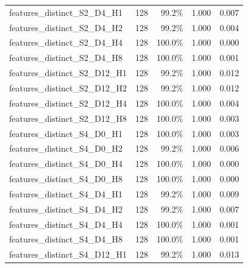 \documentclass[11pt]{article}
\begin{document}
\begin{longtable}{p{}rrrr}
features\_\allowbreak{}distinct\_\allowbreak{}S2\_\allowbreak{}D4\_\allowbreak{}H1 & 128 & 99.2\% & 1.000 & 0.007\\
features\_\allowbreak{}distinct\_\allowbreak{}S2\_\allowbreak{}D4\_\allowbreak{}H2 & 128 & 99.2\% & 1.000 & 0.004\\
features\_\allowbreak{}distinct\_\allowbreak{}S2\_\allowbreak{}D4\_\allowbreak{}H4 & 128 & 100.0\% & 1.000 & 0.000\\
features\_\allowbreak{}distinct\_\allowbreak{}S2\_\allowbreak{}D4\_\allowbreak{}H8 & 128 & 100.0\% & 1.000 & 0.001\\
features\_\allowbreak{}distinct\_\allowbreak{}S2\_\allowbreak{}D12\_\allowbreak{}H1 & 128 & 99.2\% & 1.000 & 0.012\\
features\_\allowbreak{}distinct\_\allowbreak{}S2\_\allowbreak{}D12\_\allowbreak{}H2 & 128 & 99.2\% & 1.000 & 0.012\\
features\_\allowbreak{}distinct\_\allowbreak{}S2\_\allowbreak{}D12\_\allowbreak{}H4 & 128 & 100.0\% & 1.000 & 0.004\\
features\_\allowbreak{}distinct\_\allowbreak{}S2\_\allowbreak{}D12\_\allowbreak{}H8 & 128 & 100.0\% & 1.000 & 0.003\\
features\_\allowbreak{}distinct\_\allowbreak{}S4\_\allowbreak{}D0\_\allowbreak{}H1 & 128 & 100.0\% & 1.000 & 0.003\\
features\_\allowbreak{}distinct\_\allowbreak{}S4\_\allowbreak{}D0\_\allowbreak{}H2 & 128 & 99.2\% & 1.000 & 0.006\\
features\_\allowbreak{}distinct\_\allowbreak{}S4\_\allowbreak{}D0\_\allowbreak{}H4 & 128 & 100.0\% & 1.000 & 0.000\\
features\_\allowbreak{}distinct\_\allowbreak{}S4\_\allowbreak{}D0\_\allowbreak{}H8 & 128 & 100.0\% & 1.000 & 0.000\\
features\_\allowbreak{}distinct\_\allowbreak{}S4\_\allowbreak{}D4\_\allowbreak{}H1 & 128 & 99.2\% & 1.000 & 0.009\\
features\_\allowbreak{}distinct\_\allowbreak{}S4\_\allowbreak{}D4\_\allowbreak{}H2 & 128 & 99.2\% & 1.000 & 0.007\\
features\_\allowbreak{}distinct\_\allowbreak{}S4\_\allowbreak{}D4\_\allowbreak{}H4 & 128 & 100.0\% & 1.000 & 0.001\\
features\_\allowbreak{}distinct\_\allowbreak{}S4\_\allowbreak{}D4\_\allowbreak{}H8 & 128 & 100.0\% & 1.000 & 0.001\\
features\_\allowbreak{}distinct\_\allowbreak{}S4\_\allowbreak{}D12\_\allowbreak{}H1 & 128 & 99.2\% & 1.000 & 0.013\\

\end{longtable}
\end{document}
